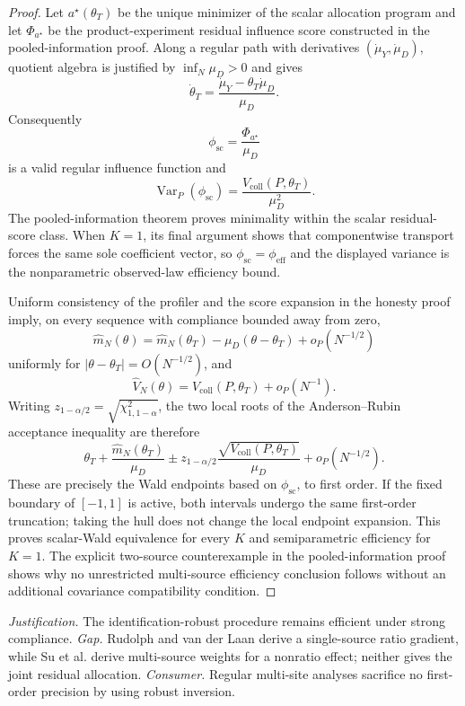\documentclass{article}
\begin{document}
\begin{proof}
Let \(a^{\star}(\theta_T)\) be the unique minimizer of the scalar allocation program and let \(\Phi_{a^{\star}}\) be the product-experiment residual influence score constructed in the pooled-information proof. Along a regular path with derivatives \((\dot\mu_Y,\dot\mu_D)\), quotient algebra is justified by \(\inf_N\mu_D>0\) and gives
\[
 \dot\theta_T
 =\frac{\dot\mu_Y-\theta_T\dot\mu_D}{\mu_D}.
\]
Consequently
\[
 \phi_{\mathrm{sc}}=\frac{\Phi_{a^{\star}}}{\mu_D}
\]
is a valid regular influence function and
\[
 \operatorname{Var}_P(\phi_{\mathrm{sc}})
 =\frac{V_{\mathrm{coll}}(P,\theta_T)}{\mu_D^2}.
\]
The pooled-information theorem proves minimality within the scalar residual-score class. When \(K=1\), its final argument shows that componentwise transport forces the same sole coefficient vector, so \(\phi_{\mathrm{sc}}=\phi_{\mathrm{eff}}\) and the displayed variance is the nonparametric observed-law efficiency bound.

Uniform consistency of the profiler and the score expansion in the honesty proof imply, on every sequence with compliance bounded away from zero,
\[
 \widehat m_N(\theta)
 =\widehat m_N(\theta_T)-\mu_D(\theta-\theta_T)+o_P(N^{-1/2})
\]
uniformly for \(|\theta-\theta_T|=O(N^{-1/2})\), and
\[
 \widehat V_N(\theta)
 =V_{\mathrm{coll}}(P,\theta_T)+o_P(N^{-1}).
\]
Writing \(z_{1-\alpha/2}=\sqrt{\chi^2_{1,1-\alpha}}\), the two local roots of the Anderson--Rubin acceptance inequality are therefore
\[
 \theta_T+\frac{\widehat m_N(\theta_T)}{\mu_D}
 \mathbin{\pm}
 z_{1-\alpha/2}
 \frac{\sqrt{V_{\mathrm{coll}}(P,\theta_T)}}{\mu_D}
 +o_P(N^{-1/2}).
\]
These are precisely the Wald endpoints based on \(\phi_{\mathrm{sc}}\), to first order. If the fixed boundary of \([-1,1]\) is active, both intervals undergo the same first-order truncation; taking the hull does not change the local endpoint expansion. This proves scalar-Wald equivalence for every \(K\) and semiparametric efficiency for \(K=1\). The explicit two-source counterexample in the pooled-information proof shows why no unrestricted multi-source efficiency conclusion follows without an additional covariance compatibility condition.
\end{proof}
\par\smallskip\noindent \textit{Justification.} The identification-robust procedure remains efficient under strong compliance. \textit{Gap.} Rudolph and van der Laan derive a single-source ratio gradient, while Su et al. derive multi-source weights for a nonratio effect; neither gives the joint residual allocation. \textit{Consumer.} Regular multi-site analyses sacrifice no first-order precision by using robust inversion.
\end{document}
